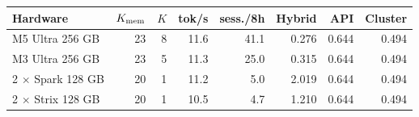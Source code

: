 \begin{tabular}{@{}lrrrrrrr@{}}
\toprule
Hardware & $K_{\rm mem}$ & $K$ & tok/s & sess./8h & Hybrid & API & Cluster \\
\midrule
M5 Ultra 256 GB & 23 & 8 & 11.6 & 41.1 & 0.276 & 0.644 & 0.494 \\
M3 Ultra 256 GB & 23 & 5 & 11.3 & 25.0 & 0.315 & 0.644 & 0.494 \\
2 $\times$ Spark 128 GB & 20 & 1 & 11.2 & 5.0 & 2.019 & 0.644 & 0.494 \\
2 $\times$ Strix 128 GB & 20 & 1 & 10.5 & 4.7 & 1.210 & 0.644 & 0.494 \\
\bottomrule
\end{tabular}
